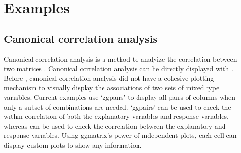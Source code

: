 \documentclass[article]{jss}
\begin{document}





\newpage

\section[Examples]{Examples}



\subsection{Canonical correlation analysis}

  Canonical correlation analysis is a method to analyize the correlation between two matrices \cite{hotelling36cca}.
  Canonical correlation analysis can be directly displayed with .
  Before , canonical correlation analysis did not have a cohesive plotting mechanism to visually display the associations of two sets of mixed type variables.
  Current examples use `ggpairs' to display all pairs of columns when only a subset of combinations are needed.
  `ggpairs' can be used to check the within correlation of both the explanatory variables and response variables,  whereas  can be used to check the correlation between the explanatory and response variables.
  Using ggmatrix's power of independent plots, each cell can display custom plots to show any information.
\end{document}
